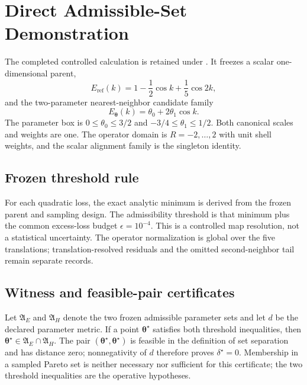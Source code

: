 \section{Direct Admissible-Set Demonstration}
\label{app:direct-admissible-set-demonstration}

The completed controlled calculation is retained under
. It freezes a scalar
one-dimensional parent,
\begin{equation*}
 E_{\mathrm{ref}}(k)=1-\frac12\cos k+\frac15\cos 2k,
\end{equation*}
and the two-parameter nearest-neighbor candidate family
\begin{equation*}
 E_{\bm{\theta}}(k)=\theta_0+2\theta_1\cos k.
\end{equation*}
The parameter box is
$0\leq\theta_0\leq3/2$ and $-3/4\leq\theta_1\leq1/2$. Both canonical scales
and weights are one. The operator domain is $R=-2,\ldots,2$ with unit shell
weights, and the scalar alignment family is the singleton identity.

\subsection{Frozen threshold rule}

For each quadratic loss, the exact analytic minimum is derived from the frozen
parent and sampling design. The admissibility threshold is that minimum plus
the common excess-loss budget $\epsilon=10^{-4}$. This is a controlled map
resolution, not a statistical uncertainty. The operator normalization is
global over the five translations; translation-resolved residuals and the
omitted second-neighbor tail remain separate records.

\subsection{Witness and feasible-pair certificates}

Let $\mathfrak A_E$ and $\mathfrak A_H$ denote the two frozen admissible
parameter sets and let $d$ be the declared parameter metric. If a point
$\bm\theta^\star$ satisfies both threshold inequalities, then
$\bm\theta^\star\in\mathfrak A_E\cap\mathfrak A_H$. The pair
$(\bm\theta^\star,\bm\theta^\star)$ is feasible in the definition of set
separation and has distance zero; nonnegativity of $d$ therefore proves
$\delta^\star=0$. Membership in a sampled Pareto set is neither necessary nor
sufficient for this certificate; the two threshold inequalities are the
operative hypotheses.

